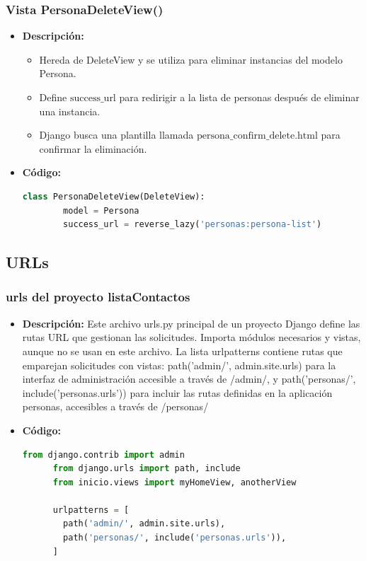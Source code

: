 \documentclass{article}
\begin{document}
  
  \subsubsection{Vista PersonaDeleteView()}
  \begin{itemize}
    \item \textbf{Descripción: }
    \begin{itemize}
      \item Hereda de DeleteView y se utiliza para eliminar instancias del modelo Persona.
      \item Define $\text{success\_url}$ para redirigir a la lista de personas después de eliminar una instancia.
      \item Django busca una plantilla llamada $\text{persona\_confirm\_delete.html}$ para confirmar la eliminación.
    \end{itemize}
    \item \textbf{Código: }
    \begin{lstlisting}[language=Python]
      class PersonaDeleteView(DeleteView):
        model = Persona
        success_url = reverse_lazy('personas:persona-list')
    \end{lstlisting}   
  \end{itemize}
  

  \subsection{URLs}
  
  
  \subsubsection{urls del proyecto listaContactos}
  \begin{itemize}
    \item \textbf{Descripción: }Este archivo urls.py principal de un proyecto Django define las rutas URL que gestionan las solicitudes. 
    Importa módulos necesarios y vistas, aunque no se usan en este archivo. La lista urlpatterns contiene rutas que emparejan 
    solicitudes con vistas: path('admin/', admin.site.urls) para la interfaz de administración accesible a través de /admin/, 
    y path('personas/', include('personas.urls')) para incluir las rutas definidas en la aplicación personas, accesibles a 
    través de /personas/
    \item \textbf{Código: }
    \begin{lstlisting}[language=Python]
      from django.contrib import admin
      from django.urls import path, include
      from inicio.views import myHomeView, anotherView

      urlpatterns = [
        path('admin/', admin.site.urls),
        path('personas/', include('personas.urls')),
      ]
    \end{lstlisting}   
  \end{itemize}
  
\end{document}
